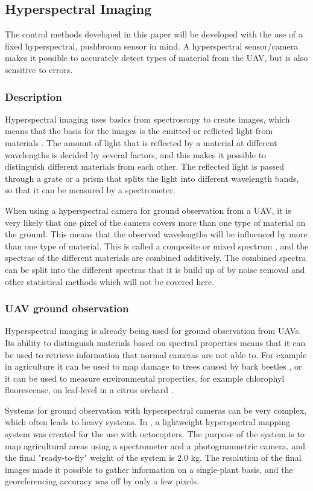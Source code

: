 \subsection{Hyperspectral Imaging}
The control methods developed in this paper will be developed with the use of a fixed hyperspectral, pushbroom sensor in mind. A hyperspectral sensor/camera makes it possible to accurately detect types of material from the UAV, but is also sensitive to errors.


\subsubsection{Description}
Hyperspectral imaging uses basics from spectroscopy to create images, which means that the basis for the images is the emitted or reflicted light from materials \cite{hypSMITH}. The amount of light that is reflected by a material at different wavelengths is decided by several factors, and this makes it possible to distinguish different materials from each other. The reflected light is passed through a grate or a prism that splits the light into different wavelength bands, so that it can be measured by a spectrometer.

When using a hyperspectral camera for ground observation from a UAV, it is very likely that one pixel of the camera covers more than one type of material on the ground. This means that the observed wavelengths will be influenced by more than one type of material. This is called a composite or mixed spectrum \cite{hypSMITH}, and the spectras of the different materials are combined additively. The combined spectra can be split into the different spectras that it is build up of by noise removal and other statistical methods which will not be covered here.


\subsubsection{UAV ground observation}
Hyperspectral imaging is already being used for ground observation from UAVs. Its ability to distinguish materials based on spectral properties means that it can be used to retrieve information that normal cameras are not able to. For example in agriculture it can be used to map damage to trees caused by bark beetles \cite{beetleNASI}, or it can be used to measure environmental properties, for example chlorophyl fluorescense, on leaf-level in a citrus orchard \cite{waterStressBERNI}.

Systems for ground observation with hyperspectral cameras can be very complex, which often leads to heavy systems. In \cite{hymsySUOMALAINEN}, a lightweight hyperspectral mapping system was created for the use with octocopters. The purpose of the system is to map agricultural areas using a spectrometer and a photogrammetric camera, and the final "ready-to-fly" weight of the system is $2.0$ kg. The resolution of the final images made it possible to gather information on a single-plant basis, and the georeferencing accuracy was off by only a few pixels.


